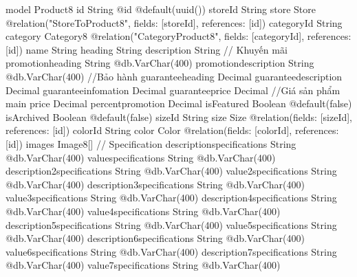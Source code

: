 model Product8 {
  id                           String                         @id @default(uuid())
  storeId                      String
  store                        Store                          @relation("StoreToProduct8", fields: [storeId], references: [id])
  categoryId                   String
  category                     Category8                      @relation("CategoryProduct8", fields: [categoryId], references: [id])
  name                         String
  heading                      String
  description                  String
  // Khuyến mãi
  promotionheading             String                         @db.VarChar(400)
  promotiondescription         String                         @db.VarChar(400)
  //Bảo hành
  guaranteeheading             Decimal
  guaranteedescription         Decimal
  guaranteeinfomation          Decimal
  guaranteeprice               Decimal
  //Giá sản phẩm main
  price                        Decimal
  percentpromotion             Decimal
  isFeatured                   Boolean                        @default(false)
  isArchived                   Boolean                        @default(false)
  sizeId                       String
  size                         Size                           @relation(fields: [sizeId], references: [id])
  colorId                      String
  color                        Color                          @relation(fields: [colorId], references: [id])
  images                       Image8[]
  // Specification
  descriptionspecifications    String                         @db.VarChar(400)
  valuespecifications          String                         @db.VarChar(400)
  description2specifications   String                         @db.VarChar(400)
  value2specifications         String                         @db.VarChar(400)
  description3specifications   String                         @db.VarChar(400)
  value3specifications         String                         @db.VarChar(400)
  description4specifications   String                         @db.VarChar(400)
  value4specifications         String                         @db.VarChar(400)
  description5specifications   String                         @db.VarChar(400)
  value5specifications         String                         @db.VarChar(400)
  description6specifications   String                         @db.VarChar(400)
  value6specifications         String                         @db.VarChar(400)
  description7specifications   String                         @db.VarChar(400)
  value7specifications         String                         @db.VarChar(400)
}
